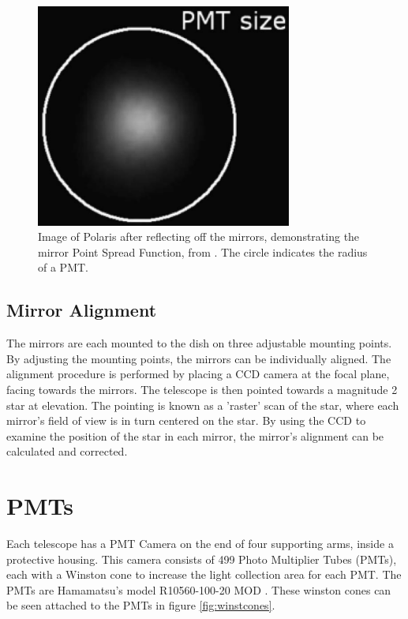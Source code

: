 \begin{figure}[h]
  \begin{center}
    \includegraphics[width=0.75\textwidth]{images/mirror_polaris.eps}
    \caption[Polaris PSF]{Image of Polaris after reflecting off the mirrors, demonstrating the mirror Point Spread Function, from \cite{Veritas_Detector}.  The circle indicates the radius of a PMT.}\label{fig:mirrorpolaris}
  \end{center}
\end{figure}

\subsection{Mirror Alignment}
The mirrors are each mounted to the dish on three adjustable mounting points.
By adjusting the mounting points, the mirrors can be individually aligned.
The alignment procedure is performed by placing a CCD camera at the focal plane, facing towards the mirrors.
The telescope is then pointed towards a magnitude 2 star at \degree elevation.
The pointing is known as a 'raster' scan of the star, where each mirror's field of view is in turn centered on the star.
By using the CCD to examine the position of the star in each mirror, the mirror's alignment can be calculated and corrected.



\section{PMTs}\label{sec:pmts}

Each telescope has a PMT Camera on the end of four supporting arms, inside a protective housing.
This camera consists of 499 Photo Multiplier Tubes (PMTs), each with a Winston cone to increase the light collection area for each PMT.
The PMTs are Hamamatsu's model R10560-100-20 MOD \cite{pmtmodels}.
These winston cones can be seen attached to the PMTs in figure \ref{fig:winstcones}.

